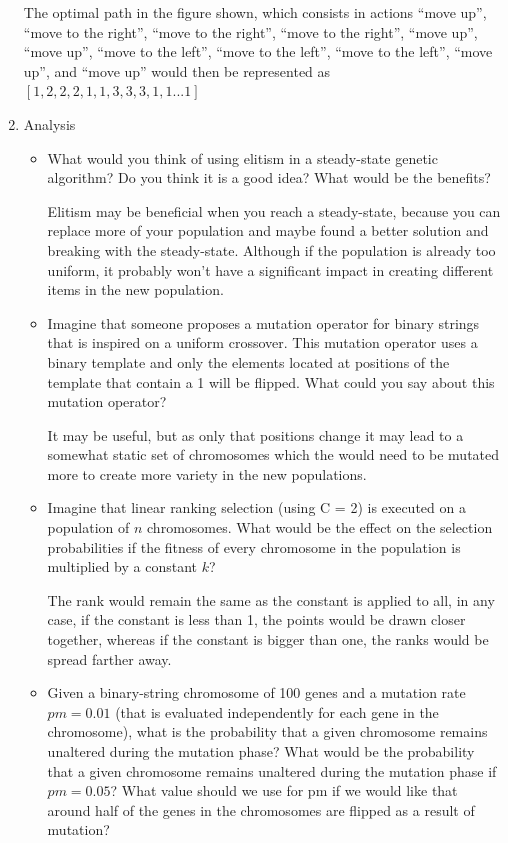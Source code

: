 \documentclass{article}
\begin{document}
\begin{enumerate}
    The optimal path in the figure shown, which consists in actions “move up”, “move to the right”, “move to the right”, “move to the right”, “move up”, “move up”, “move to the left”, “move to the left”, “move to the left”, “move up”, and “move up”  would then be represented as $[1,2,2,2,1,1,3,3,3,1,1 ... 1]$

    \item Analysis
    \begin{itemize}
        \item What would you think of using elitism in a steady-state genetic algorithm? Do you think it is a good idea? What would be the benefits?

        Elitism may be beneficial when you reach a steady-state, because you can replace more of your population and maybe found a better solution and breaking with the steady-state. Although if the population is already too uniform, it probably won't have a significant impact in creating different items in the new population.

        \item Imagine that someone proposes a mutation operator for binary strings that is inspired on a uniform crossover. This mutation operator uses a binary template and only the elements located at positions of the template that contain a 1 will be flipped. What could you say about this mutation operator?

        It may be useful, but as only that positions change it may lead to a somewhat static set of chromosomes which the would need to be mutated more to create more variety in the new populations.

        \item Imagine that linear ranking selection (using C = 2) is executed on a population of $n$ chromosomes. What would be the effect on the selection probabilities if the fitness of every chromosome in the population is multiplied by a constant $k$?

        The rank would remain the same as the constant is applied to all, in any case, if the constant is less than 1, the points would be drawn closer together, whereas if the constant is bigger than one, the ranks would be spread farther away.

        \item Given a binary-string chromosome of 100 genes and a mutation rate $pm = 0.01$ (that is evaluated independently for each gene in the chromosome), what is the probability that a given chromosome  remains unaltered during the mutation phase? What would be the probability that a given chromosome remains unaltered during the mutation phase if $pm = 0.05$? What value should we use for pm if we would like that around half of the genes in the chromosomes are flipped as a result of mutation?


\end{itemize}
\end{enumerate}
\end{document}
